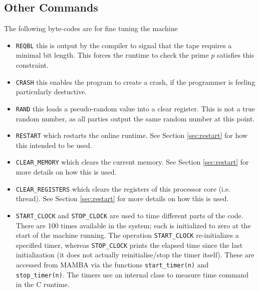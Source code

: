 \subsection{Other Commands}
The following byte-codes are for fine tuning the machine
\begin{itemize}
\item \verb+REQBL+ this is output by the compiler to signal that
the tape requires a minimal bit length. This forces the runtime
to check the prime $p$ satisfies this constraint.
\item \verb+CRASH+ this enables the program to create a crash,
if the programmer is feeling particularly destuctive.
\item \verb+RAND+ this loads a pseudo-random value into a
clear register. This is not a true random number, as all
parties output the same random number at this point.
\item \verb+RESTART+ which restarts the online runtime.
See Section \ref{sec:restart} for how this intended to be used.
\item \verb+CLEAR_MEMORY+ which clears the current memory.
See Section \ref{sec:restart} for more details on how this is used.
\item \verb+CLEAR_REGISTERS+ which clears the registers of this processor core (i.e. thread).
See Section \ref{sec:restart} for more details on how this is used.
\item \verb+START_CLOCK+ and \verb+STOP_CLOCK+ are used to time different
parts of the code. There are 100 times available in the system;
each is initialized to zero at the start of the machine running.
The operation \verb+START_CLOCK+ re-initializes a specified timer,
whereas \verb+STOP_CLOCK+ prints the elapsed time since the last
initialization (it does not actually reinitialise/stop the timer itself).
These are accessed from MAMBA via the functions
\verb+start_timer(n)+ and \verb+stop_timer(n)+.
The timers use an internal class to measure time command in the C runtime. 
\end{itemize}



